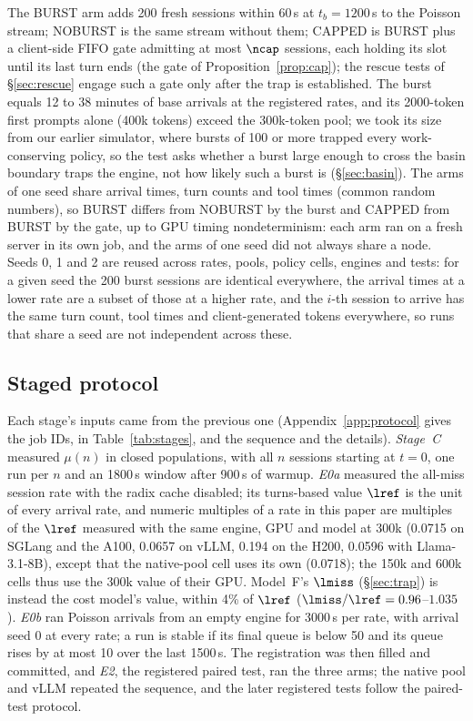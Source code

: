 The BURST arm adds 200 fresh sessions within 60\,s at $t_b=1200$\,s to the Poisson stream; NOBURST is the same stream without them; CAPPED is BURST plus a client-side FIFO gate admitting at most $\ncap$ sessions, each holding its slot until its last turn ends (the gate of Proposition~\ref{prop:cap}); the rescue tests of \S\ref{sec:rescue} engage such a gate only after the trap is established. The burst equals 12 to 38 minutes of base arrivals at the registered rates, and its 2000-token first prompts alone (400k tokens) exceed the 300k-token pool; we took its size from our earlier simulator, where bursts of 100 or more trapped every work-conserving policy, so the test asks whether a burst large enough to cross the basin boundary traps the engine, not how likely such a burst is (\S\ref{sec:basin}). The arms of one seed share arrival times, turn counts and tool times (common random numbers), so BURST differs from NOBURST by the burst and CAPPED from BURST by the gate, up to GPU timing nondeterminism: each arm ran on a fresh server in its own job, and the arms of one seed did not always share a node. Seeds 0, 1 and 2 are reused across rates, pools, policy cells, engines and tests: for a given seed the 200 burst sessions are identical everywhere, the arrival times at a lower rate are a subset of those at a higher rate, and the $i$-th session to arrive has the same turn count, tool times and client-generated tokens everywhere, so runs that share a seed are not independent across these.

\subsection{Staged protocol}\label{sec:stages}
Each stage's inputs came from the previous one (Appendix~\ref{app:protocol} gives the job IDs, in Table~\ref{tab:stages}, and the sequence and the details). \emph{Stage~C} measured $\mu(n)$ in closed populations, with all $n$ sessions starting at $t=0$, one run per $n$ and an 1800\,s window after 900\,s of warmup. \emph{E0a} measured the all-miss session rate with the radix cache disabled; its turns-based value $\lref$ is the unit of every arrival rate, and numeric multiples of a rate in this paper are multiples of the $\lref$ measured with the same engine, GPU and model at 300k (0.0715\sps{} on SGLang and the A100, 0.0657 on vLLM, 0.194 on the H200, 0.0596 with Llama-3.1-8B), except that the native-pool cell uses its own (0.0718); the 150k and 600k cells thus use the 300k value of their GPU. Model~F's $\lmiss$ (\S\ref{sec:trap}) is instead the cost model's value, within 4\% of $\lref$ ($\lmiss/\lref=0.96$--$1.035$). \emph{E0b} ran Poisson arrivals from an empty engine for 3000\,s per rate, with arrival seed 0 at every rate; a run is stable if its final queue is below 50 and its queue rises by at most 10 over the last 1500\,s. The registration was then filled and committed, and \emph{E2}, the registered paired test, ran the three arms; the native pool and vLLM repeated the sequence, and the later registered tests follow the paired-test protocol.


